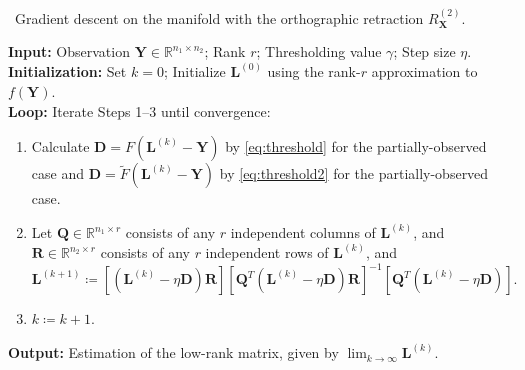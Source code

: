\documentclass[12pt]{article}
\newcommand{\grad}{\nabla}
\newcommand{\bX}{\boldsymbol{X}}
\newcommand{\bL}{\boldsymbol{L}}
\newcommand{\bP}{\boldsymbol{P}}
\newcommand{\bQ}{\boldsymbol{Q}}
\newcommand{\bD}{\boldsymbol{D}}
\newcommand{\bU}{\boldsymbol{U}}
\newcommand{\bV}{\boldsymbol{V}}
\def\reals{\mathbb{R}}
\def\bP{\boldsymbol{P}}
\def\bQ{\boldsymbol{Q}}
\def\bU{\boldsymbol{U}}
\def\bR{\boldsymbol{R}}
\def\bY{\boldsymbol{Y}}
\theoremstyle{plain}
\theoremstyle{definition}
\theoremstyle{plain}
\theoremstyle{plain}
\theoremstyle{remark}
\begin{document}
\begin{algorithm}[H]
\caption{\ Gradient descent on the manifold with the orthographic retraction $R_{\bX}^{(2)}$.}\label{alg:gradient2}
\vspace{0.3cm}
{\bf Input:}  Observation $\bY\in\reals^{n_1\times n_2}$; Rank $r$; Thresholding value $\gamma$; Step size $\eta$.\\ 
{\bf Initialization:}  Set $k=0$; Initialize $\bL^{(0)}$ using the rank-$r$ approximation to $f(\bY)$.\\
{\bf Loop:} Iterate Steps 1--3 until convergence:
\begin{enumerate}
\item Calculate $\bD=F(\bL^{(k)}-\bY)$ by \eqref{eq:threshold} for the partially-observed case and $\bD=\tilde{F}(\bL^{(k)}-\bY)$ by \eqref{eq:threshold2} for the partially-observed case. 
\item Let $\bQ\in\reals^{n_1\times r}$ consists of any $r$ independent columns of $\bL^{(k)}$, and $\bR\in\reals^{n_2\times r}$ consists of any $r$ independent rows of $\bL^{(k)}$, and
\[
\bL^{(k+1)}\coloneqq \left[(\bL^{(k)}-\eta \bD)\bR\right]\left[\bQ^{T}(\bL^{(k)}-\eta \bD)\bR\right]^{-1}\left[\bQ^{T}(\bL^{(k)}-\eta \bD)\right].
\]
\item $k\coloneqq k+1$. 
\end{enumerate}
{\bf Output:} Estimation of the low-rank matrix, given by $\lim_{k\rightarrow\infty}\bL^{(k)}$.
\vspace{0.3cm}
\end{algorithm}



\end{document}
